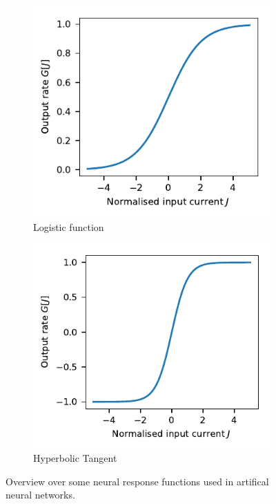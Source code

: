 \documentclass[10pt,letterpaper,oneside]{article}
\begin{document}
\begin{figure}
\begin{subfigure}{0.5\textwidth}
	\end{subfigure}
	\begin{subfigure}{0.5\textwidth}%
		\centering%
		\includegraphics{media/nonlinearity_logistic.pdf}%
		\caption{Logistic function}%
		\label{fig:artificial_neurons_logistic}
	\end{subfigure}%
	\begin{subfigure}{0.5\textwidth}%
		\centering%
		\includegraphics{media/nonlinearity_tanh.pdf}%
		\caption{Hyperbolic Tangent}%
		\label{fig:artificial_neurons_tanh}
	\end{subfigure}
	\caption{Overview over some neural response functions used in artifical neural networks.}
	\label{fig:artificial_neurons}
\end{figure}
\end{document}
